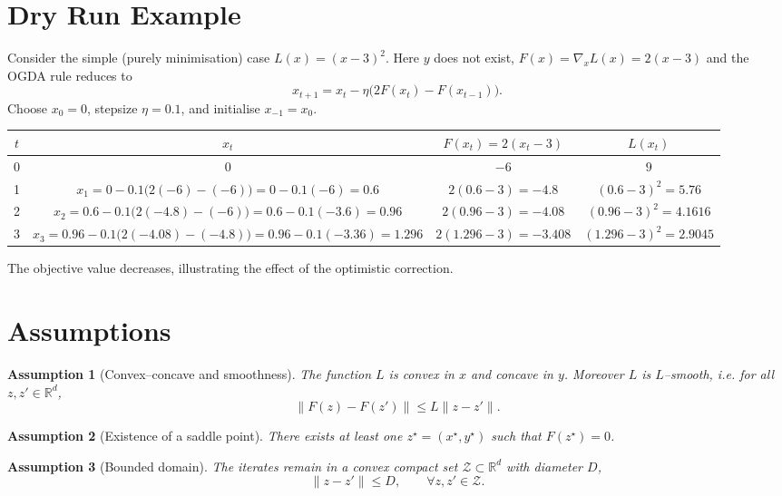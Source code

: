 \documentclass{article}
\newtheorem{assumption}{Assumption}
\begin{document}
\section*{Dry Run Example}
Consider the simple (purely minimisation) case $L(x)= (x-3)^2$.
Here $y$ does not exist, $F(x)=\nabla_x L(x)=2(x-3)$ and the OGDA rule reduces to
\[
x_{t+1}=x_t-\eta\bigl(2F(x_t)-F(x_{t-1})\bigr).
\]
Choose $x_0=0$, stepsize $\eta=0.1$, and initialise $x_{-1}=x_0$.

\begin{center}
\begin{tabular}{c|c|c|c}
$t$ & $x_t$ & $F(x_t)=2(x_t-3)$ & $L(x_t)$\\\hline
0 & $0$ & $-6$ & $9$\\
1 & $x_1=0-0.1\bigl(2(-6)-(-6)\bigr)=0-0.1(-6)=0.6$ & $2(0.6-3)=-4.8$ & $(0.6-3)^2=5.76$\\
2 & $x_2=0.6-0.1\bigl(2(-4.8)-(-6)\bigr)=0.6-0.1(-3.6)=0.96$ & $2(0.96-3)=-4.08$ & $(0.96-3)^2=4.1616$\\
3 & $x_3=0.96-0.1\bigl(2(-4.08)-(-4.8)\bigr)=0.96-0.1(-3.36)=1.296$ & $2(1.296-3)=-3.408$ & $(1.296-3)^2=2.9045$
\end{tabular}
\end{center}
The objective value decreases, illustrating the effect of the optimistic correction.

\section*{Assumptions}
\begin{assumption}[Convex–concave and smoothness]\label{ass:cc}
The function $L$ is convex in $x$ and concave in $y$.
Moreover $L$ is $L$–smooth, i.e. for all $z,z'\in\mathbb{R}^d$,
\[
\|F(z)-F(z')\|\le L\|z-z'\|.
\]
\end{assumption}

\begin{assumption}[Existence of a saddle point]\label{ass:saddle}
There exists at least one $z^\star=(x^\star ,y^\star)$ such that $F(z^\star)=0$.
\end{assumption}

\begin{assumption}[Bounded domain]\label{ass:bounded}
The iterates remain in a convex compact set $\mathcal{Z}\subset\mathbb{R}^d$ with diameter $D$,
\[
\|z-z'\|\le D,\qquad\forall z,z'\in\mathcal{Z}.
\]
\end{assumption}
\end{document}
